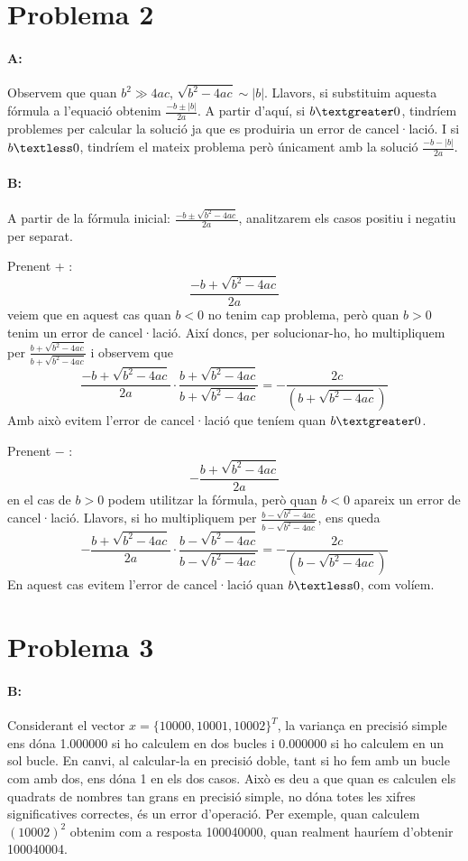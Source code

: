 \documentclass{article}
\begin{document}
	\newpage
	
	\section{Problema 2}
	\paragraph{A:} Observem que quan $b^2 \gg 4ac$, $\sqrt{b^2-4ac}\sim|b|$. Llavors, si substituim aquesta fórmula a l'equació obtenim $\frac{-b\pm|b|}{2a}$. A partir d'aquí, si $b\textgreater0$, tindríem problemes per calcular la solució ja que es produiria un error de cancel·lació. I si $b\textless0$, tindríem el mateix problema però únicament amb la solució $\frac{-b-|b|}{2a}$.
	
	\paragraph{B:} A partir de la fórmula inicial: $\frac{-b\pm\sqrt{b^2-4ac}}{2a}$, analitzarem els casos positiu i negatiu per separat.
	
	Prenent + : $$\frac{-b+\sqrt{b^2-4ac}}{2a}$$ 
	veiem que en aquest cas quan $b<0$ no tenim cap problema, però quan $b>0$ tenim un error de cancel·lació. Així doncs, per solucionar-ho, ho multipliquem per $\frac{b+\sqrt{b^2-4ac}}{b+\sqrt{b^2-4ac}}$ i observem que 
	$$\frac{-b+\sqrt{b^2-4ac}}{2a}\cdot\frac{b+\sqrt{b^2-4ac}}{b+\sqrt{b^2-4ac}}=-\frac{2c}{(b+\sqrt{b^2-4ac})}$$
	Amb això evitem l'error de cancel·lació que teníem quan $b\textgreater0$.
	
	Prenent $-$ : $$-\frac{b+\sqrt{b^2-4ac}}{2a}$$
	en el cas de $b>0$ podem utilitzar la fórmula, però quan $b<0$ apareix un error de cancel·lació. Llavors, si ho multipliquem per $\frac{b-\sqrt{b^2-4ac}}{b-\sqrt{b^2-4ac}}$, ens queda 
	$$-\frac{b+\sqrt{b^2-4ac}}{2a}\cdot\frac{b-\sqrt{b^2-4ac}}{b-\sqrt{b^2-4ac}}=-\frac{2c}{(b-\sqrt{b^2-4ac})}$$
	En aquest cas evitem l'error de cancel·lació quan $b\textless0$, com volíem.
	
	\newpage
	
	\section{Problema 3}
	\paragraph{B:} Considerant el vector $x={\{10000,10001,10002\}}^T$, la variança en precisió simple ens dóna 1.000000 si ho calculem en dos bucles i 0.000000 si ho calculem en un sol bucle. En canvi, al calcular-la en precisió doble, tant si ho fem amb un bucle com amb dos, ens dóna 1 en els dos casos. Això es deu a que quan es calculen els quadrats de nombres tan grans en precisió simple, no dóna totes les xifres significatives correctes, és un error d'operació.
	Per exemple, quan calculem $(10002)^2$ obtenim com a resposta 100040000, quan realment hauríem d'obtenir 100040004.
	
\end{document}
